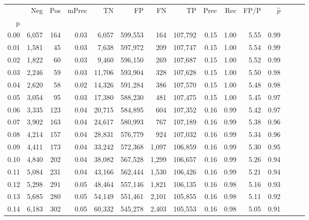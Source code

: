 \begin{tabular}{rrrrrrrrrrrrrrr}
\toprule
{} &     Neg &    Pos & mPrec &       TN &       FP &       FN &       TP &  Prec &   Rec &  FP/P & $\hat{p}$ \\
p    &         &        &       &          &          &          &          &       &       &       &           \\
\midrule
0.00 &   6,057 &    164 &  0.03 &    6,057 &  599,553 &      164 &  107,792 &  0.15 &  1.00 &  5.55 &      0.99 \\
0.01 &   1,581 &     45 &  0.03 &    7,638 &  597,972 &      209 &  107,747 &  0.15 &  1.00 &  5.54 &      0.99 \\
0.02 &   1,822 &     60 &  0.03 &    9,460 &  596,150 &      269 &  107,687 &  0.15 &  1.00 &  5.52 &      0.99 \\
0.03 &   2,246 &     59 &  0.03 &   11,706 &  593,904 &      328 &  107,628 &  0.15 &  1.00 &  5.50 &      0.98 \\
0.04 &   2,620 &     58 &  0.02 &   14,326 &  591,284 &      386 &  107,570 &  0.15 &  1.00 &  5.48 &      0.98 \\
0.05 &   3,054 &     95 &  0.03 &   17,380 &  588,230 &      481 &  107,475 &  0.15 &  1.00 &  5.45 &      0.97 \\
0.06 &   3,335 &    123 &  0.04 &   20,715 &  584,895 &      604 &  107,352 &  0.16 &  0.99 &  5.42 &      0.97 \\
0.07 &   3,902 &    163 &  0.04 &   24,617 &  580,993 &      767 &  107,189 &  0.16 &  0.99 &  5.38 &      0.96 \\
0.08 &   4,214 &    157 &  0.04 &   28,831 &  576,779 &      924 &  107,032 &  0.16 &  0.99 &  5.34 &      0.96 \\
0.09 &   4,411 &    173 &  0.04 &   33,242 &  572,368 &    1,097 &  106,859 &  0.16 &  0.99 &  5.30 &      0.95 \\
0.10 &   4,840 &    202 &  0.04 &   38,082 &  567,528 &    1,299 &  106,657 &  0.16 &  0.99 &  5.26 &      0.94 \\
0.11 &   5,084 &    231 &  0.04 &   43,166 &  562,444 &    1,530 &  106,426 &  0.16 &  0.99 &  5.21 &      0.94 \\
0.12 &   5,298 &    291 &  0.05 &   48,464 &  557,146 &    1,821 &  106,135 &  0.16 &  0.98 &  5.16 &      0.93 \\
0.13 &   5,685 &    280 &  0.05 &   54,149 &  551,461 &    2,101 &  105,855 &  0.16 &  0.98 &  5.11 &      0.92 \\
0.14 &   6,183 &    302 &  0.05 &   60,332 &  545,278 &    2,403 &  105,553 &  0.16 &  0.98 &  5.05 &      0.91 \\

\end{tabular}
